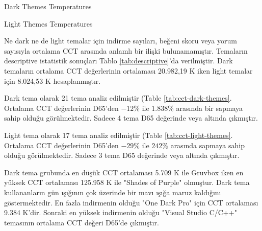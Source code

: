 \documentclass{article}
\begin{document}
\begin{table}[H]

	\caption{Dark Themes Temperatures}
  \label{tab:cct-dark-themes}
\end{table}

\begin{table}[H]

	\caption{Light Themes Temperatures}
  \label{tab:cct-light-themes}
\end{table}

Ne dark ne de light temalar için indirme sayıları, beğeni skoru veya yorum sayısıyla ortalama CCT arasında anlamlı bir
ilişki bulunamamıştır. Temaların descriptive istatistik sonuçları Tablo \ref{tab:descriptive}'da verilmiştir. Dark
temaların ortalama CCT değerlerinin ortalaması 20.982,19 K iken light temalar için 8.024,53 K hesaplanmıştır. 

Dark tema olarak 21 tema analiz edilmiştir (Table \ref{tab:cct-dark-themes}. Ortalama CCT değerlerinin D65'den $-12\%$ ile $1.838\%$ arasında bir sapmaya sahip olduğu görülmektedir. Sadece 4 tema D65 değerinde veya altında çıkmıştır.

Light tema olarak 17 tema analiz edilmiştir (Table \ref{tab:cct-light-themes}. Ortalama CCT değerlerinin D65'den $-29\%$ ile $242\%$ arasında sapmaya sahip olduğu görülmektedir. Sadece 3 tema D65 değerinde veya altında çıkmıştır.

Dark tema grubunda en düşük CCT ortalaması 5.709 K ile Gruvbox iken en yüksek CCT ortalaması 125.958 K ile "Shades of Purple"
olmuştur. Dark tema kullananların gün ışığının çok üzerinde bir
mavı ışığa maruz kaldığını göstermektedir. En fazla indirmenin olduğu "One Dark Pro" için CCT ortalaması 9.384 K'dir. Sonraki en yüksek indirmenin olduğu "Visual Studio C/C++" temasının ortalama CCT değeri D65'de çıkmıştır. 
\end{document}
